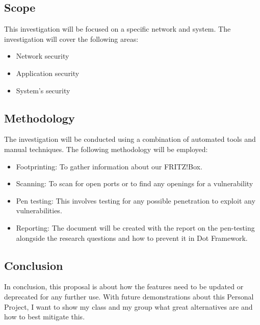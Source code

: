 \documentclass[12pt, letterpaper]{article}
\begin{document}
\subsection{Scope}
This investigation will be focused on a specific network and system. The investigation will cover the following areas:
\begin{itemize}
    \item Network security
    \item Application security
    \item System's security
\end{itemize}
\subsection{Methodology}
The investigation will be conducted using a combination of automated tools and manual techniques. The following methodology will be employed:
\begin{itemize}
    \item Footprinting: To gather information about our FRITZ!Box.
    \item Scanning: To scan for open ports or to find any openings for a vulnerability
    \item Pen testing: This involves testing for any possible penetration to exploit any vulnerabilities.
    \item Reporting: The document will be created with the report on the pen-testing alongside the research questions and how to prevent it in Dot Framework.
\end{itemize}
\subsection{Conclusion}
In conclusion, this proposal is about how the features need to be updated or deprecated for any further use. With future demonstrations about this Personal Project, I want to show my class and my group what great alternatives are and how to best mitigate this.
\end{document}
